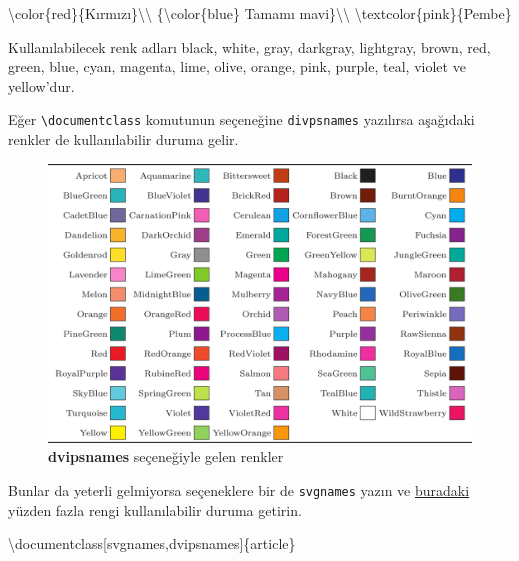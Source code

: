 \documentclass[
  letterpaper,
  DIV=11,
  numbers=noendperiod]{scrreprt}
\newenvironment{Shaded}{\begin{snugshade}}{\end{snugshade}}
\newcommand{\BuiltInTok}[1]{\textcolor[rgb]{0.00,0.23,0.31}{#1}}
\newcommand{\ExtensionTok}[1]{\textcolor[rgb]{0.00,0.23,0.31}{#1}}
\newcommand{\FunctionTok}[1]{\textcolor[rgb]{0.28,0.35,0.67}{#1}}
\newcommand{\NormalTok}[1]{\textcolor[rgb]{0.00,0.23,0.31}{#1}}
\begin{document}
\begin{Shaded}
\begin{Highlighting}[]
\FunctionTok{\textbackslash{}color}\NormalTok{\{red\}\{Kırmızı\}}\FunctionTok{\textbackslash{}\textbackslash{}}
\NormalTok{\{}\FunctionTok{\textbackslash{}color}\NormalTok{\{blue\} Tamamı mavi\}}\FunctionTok{\textbackslash{}\textbackslash{}}
\FunctionTok{\textbackslash{}textcolor}\NormalTok{\{pink\}\{Pembe\}}
\end{Highlighting}
\end{Shaded}

Kullanılabilecek renk adları black, white, gray, darkgray, lightgray,
brown, red, green, blue, cyan, magenta, lime, olive, orange, pink,
purple, teal, violet ve yellow'dur.

Eğer \texttt{\textbackslash{}documentclass} komutunun seçeneğine
\texttt{divpsnames} yazılırsa aşağıdaki renkler de kullanılabilir duruma
gelir.

\begin{figure}

{\centering \includegraphics[width=1\textwidth,height=\textheight]{./images/renkler.png}

}

\caption{\label{fig-renkler}\textbf{dvipsnames} seçeneğiyle gelen
renkler}

\end{figure}

Bunlar da yeterli gelmiyorsa seçeneklere bir de \texttt{svgnames} yazın
ve \href{https://www.latextemplates.com/svgnames-colors}{buradaki}
yüzden fazla rengi kullanılabilir duruma getirin.

\begin{Shaded}
\begin{Highlighting}[]
\BuiltInTok{\textbackslash{}documentclass}\NormalTok{[svgnames,dvipsnames]\{}\ExtensionTok{article}\NormalTok{\}}
\end{Highlighting}
\end{Shaded}
\end{document}
